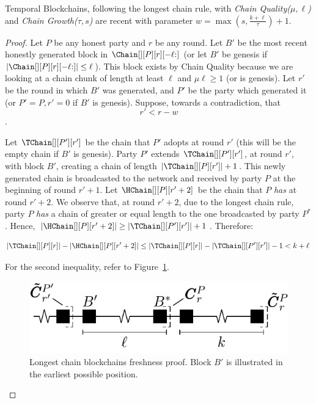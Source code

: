\begin{lemma}\label{thm.longest-chain-recency}
  Temporal Blockchains, following the longest chain rule,
  with \emph{Chain Quality($\mu,\ell$)} and
  \emph{Chain Growth($\tau, s$)}
  are recent with parameter $w = \max(s, \frac{k + \ell}{\tau}) + 1$.
\end{lemma}
\begin{proof}
  Let $P$ be any honest party and $r$ be any round.
  Let $B'$ be the most recent honestly generated block
  in $\Chain[][P][r][{-\ell}{:}]$
  (or let $B'$ be genesis if $|\Chain[][P][r][{-\ell}{:}]| \leq \ell$).
  This block exists by
  Chain Quality because we are looking at a chain chunk of length at least $\ell$ and
  $\mu\ell \geq 1$ (or is genesis).
  Let $r'$ be the round in which $B'$ was generated, and
  $P'$ be the party which generated it
  (or $P' = P, r' = 0$ if $B'$ is genesis).
  Suppose, towards a contradiction, that
  \begin{equation}
    r' < r - w \label{eq:bitcoin-r-bound}
  \end{equation}.

  Let $\TChain[][P'][r']$ be the chain that $P'$ adopts at
  round $r'$ (this will be the empty chain if $B'$ is genesis).
  Party $P'$ extends $\TChain[][P'][r']$, at round $r'$, with block $B'$,
  creating a chain of length $|\TChain[][P][r']| + 1$.
  This newly generated chain is broadcasted to the network and
  received by party $P$ at the beginning of round $r' + 1$.
  Let $\HChain[][P][r' + 2]$ be the chain
  that $P$ \emph{has} at round $r' + 2$.
  We observe that, at round $r' + 2$, due to the
  longest chain rule, party $P$ \emph{has} a chain of greater or equal
  length to the one broadcasted by party $P^*$. Hence,
  $|\HChain[][P][r' + 2]| \geq |\TChain[][P'][r']| + 1$. Therefore:

  \begin{equation}
    |\TChain[][P][r]| - |\HChain[][P][r' + 2]| \leq
     |\TChain[][P][r]| - |\TChain[][P'][r']| - 1 <
     k + \ell\, \label{eq:bitcoin-contradiction}
  \end{equation}

  For the second inequality, refer to Figure~\ref{fig:longest-chain-freshness-proof}.

  \begin{figure}
    \centering
    \includegraphics[width=0.5\columnwidth,keepaspectratio]{figures/longest-chain-proof.pdf}
    \caption{Longest chain blockchains freshness proof. Block $B'$ is illustrated in the
             earliest possible position.
    }
   \label{fig:longest-chain-freshness-proof}
  \end{figure}


\end{proof}
